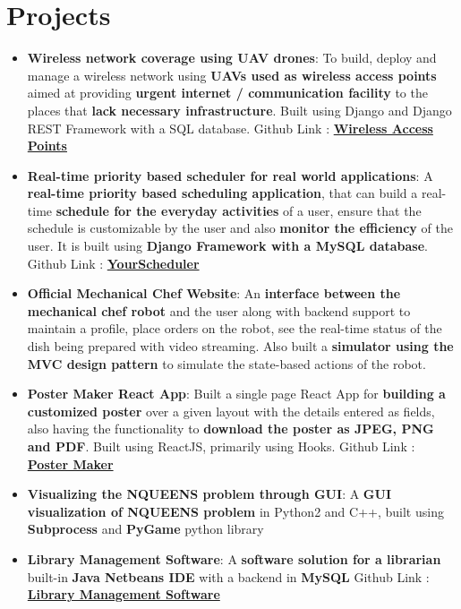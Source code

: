 \documentclass[a4paper,timesnewroman,11pt, twoside]{article}
\numberwithin{equation}{section}
\newcommand{\resumeItem}[2]{
  \item\small{
    \textbf{#1}{: #2 \vspace{-5pt}}
  }
}
\newcommand{\resumeSubItem}[2]{\resumeItem{#1}{#2}\vspace{-3pt}}
\newcommand{\resumeSubHeadingListStart}{\begin{itemize}[leftmargin=*]}
\newcommand{\resumeSubHeadingListEnd}{\end{itemize}}
\begin{document}
\section{Projects}
  \resumeSubHeadingListStart
    \resumeSubItem{Wireless network coverage using UAV drones}
    { To build, deploy and manage a wireless network using \textbf{UAVs used as wireless access points} aimed at providing \textbf{urgent internet / communication facility} to the places that \textbf{lack necessary infrastructure}. Built using Django and Django REST Framework with a SQL database. Github Link : \href{https://github.com/SaxenaKartik/MP2}{\textbf{Wireless Access Points}}
    }
    \resumeSubItem{Real-time priority based scheduler for real world applications}
    { A \textbf{real-time priority based scheduling application}, that can build a real-time \textbf{schedule for the everyday activities} of a user, ensure that the schedule is customizable by the user and also \textbf{monitor the efficiency} of the user. It is built using \textbf{Django Framework with a MySQL database}. Github Link : \href{https://github.com/SaxenaKartik/MP1}{\textbf{YourScheduler}}
    }
    \resumeSubItem{Official Mechanical Chef Website}
      {An \textbf{interface between the mechanical chef robot} and the user along with backend support to maintain a profile, place orders on the robot, see the real-time status of the dish being prepared with video streaming. Also built a \textbf{simulator using the MVC design pattern} to simulate the state-based actions of the robot.}
    \resumeSubItem{Poster Maker React App}
      {Built a single page React App for \textbf{building a customized poster} over a given layout with the details entered as fields, also having the functionality to \textbf{download the poster as JPEG, PNG and PDF}. Built using ReactJS, primarily using Hooks. Github Link : \href{/https://github.com/SaxenaKartik/Heuristics-Poster}{\textbf{Poster Maker}}
      } 
    \resumeSubItem{Visualizing the NQUEENS problem through GUI}
      {A \textbf{GUI visualization of NQUEENS problem} in Python2 and C++, built using \textbf{Subprocess} and \textbf{PyGame} python library}
    \resumeSubItem{Library Management Software}
      {A \textbf{software solution for a librarian} built-in \textbf{Java Netbeans IDE} with a backend in \textbf{MySQL} Github Link : \href{https://github.com/SaxenaKartik/Library-Management-Software}{\textbf{Library Management Software}}
      }
  \resumeSubHeadingListEnd
\end{document}
